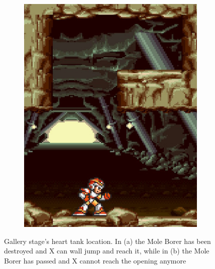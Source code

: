 \begin{figure}[htp]
\begin{subfigure}{0.3\textwidth}
		\includegraphics[width=\linewidth]{figures/X1/Armored_armadillo/Armadillo_heart_2.jpg}
		\caption{}
	\end{subfigure}
	\caption{Gallery stage's heart tank location. In (a) the Mole Borer has been destroyed and X can wall jump and reach it, while in (b) the Mole Borer has passed and X cannot reach the opening anymore}
\end{figure}

